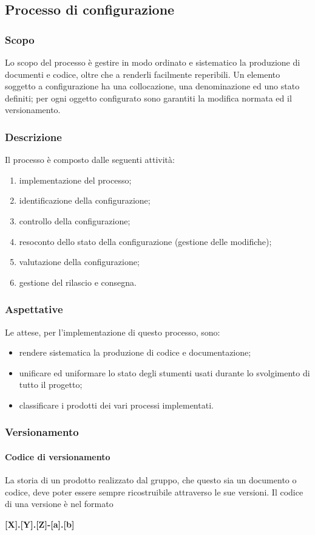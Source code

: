 \subsection{Processo di configurazione}
\subsubsection{Scopo}
Lo scopo del processo è gestire in modo ordinato e sistematico la produzione di documenti e codice, oltre che a renderli facilmente reperibili. Un elemento soggetto a configurazione ha una collocazione, una denominazione ed uno stato definiti; per ogni oggetto configurato sono garantiti la modifica normata ed il versionamento.
\subsubsection{Descrizione}
Il processo è composto dalle seguenti attività:
\begin{enumerate}
	\item implementazione del processo;
	\item identificazione della configurazione;
	\item controllo della configurazione;
	\item resoconto dello stato della configurazione (gestione delle modifiche);
	\item valutazione della configurazione;
	\item gestione del rilascio e consegna.
\end{enumerate}
\subsubsection{Aspettative}
Le attese, per l’implementazione di questo processo, sono:
\begin{itemize}
	\item rendere sistematica la produzione di codice e documentazione;
	\item unificare ed uniformare lo stato degli stumenti usati durante lo svolgimento di tutto
il progetto;
	\item classificare i prodotti dei vari processi implementati.
\end{itemize}
\subsubsection{Versionamento}
\paragraph{Codice di versionamento}
\label{cod-versionamento}
La storia di un prodotto realizzato dal gruppo, che questo sia un documento o codice, deve poter essere sempre ricostruibile attraverso le sue versioni. Il codice di una versione è nel formato\newline
\centerline{\textbf{[X].[Y].[Z]-[a].[b]}}\newline
